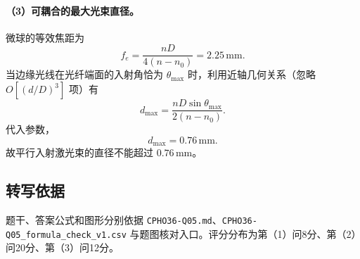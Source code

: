 \paragraph{（3）可耦合的最大光束直径。} 微球的等效焦距为
\[
f_e=\frac{nD}{4(n-n_0)}=2.25\,\mathrm{mm}.
\]
当边缘光线在光纤端面的入射角恰为 $\theta_{\max}$ 时，利用近轴几何关系（忽略 $O[(d/D)^3]$ 项）有
\[
d_{\max}=\frac{nD\sin\theta_{\max}}{2(n-n_0)}.
\]
代入参数，
\[
\boxed{d_{\max}=0.76\,\mathrm{mm}.}
\]
故平行入射激光束的直径不能超过 $0.76\,\mathrm{mm}$。

\subsection{转写依据}
题干、答案公式和图形分别依据 \texttt{CPHO36-Q05.md}、\texttt{CPHO36-Q05\_formula\_check\_v1.csv} 与题图核对入口。评分分布为第（1）问8分、第（2）问20分、第（3）问12分。
